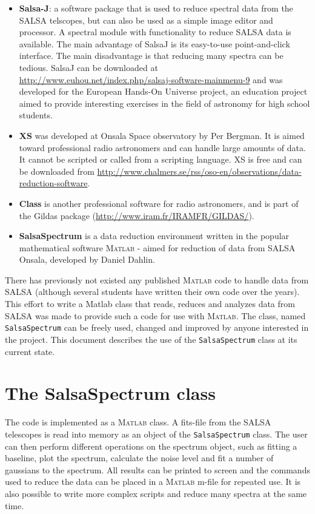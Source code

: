 \documentclass[11pt,a4paper]{article}
\begin{document}
\begin{itemize}
\item \textbf{Salsa-J}: a software package that is used to reduce
  spectral data from the SALSA telscopes, but can also be used as a
  simple image editor and processor. A spectral module with
  functionality to reduce SALSA data is available. The main advantage
  of SalsaJ is its easy-to-use point-and-click interface. The main
  disadvantage is that reducing many spectra can be tedious. SalsaJ
  can be downloaded at
  {\url{http://www.euhou.net/index.php/salsaj-software-mainmenu-9}}
  and was developed for the European Hands-On Universe project, an
  education project aimed to provide interesting exercises in the
  field of astronomy for high school students.
\item \textbf{XS} was developed at Onsala Space observatory by Per
  Bergman. It is aimed toward professional radio astronomers and can
  handle large amounts of data. It cannot be scripted or called from a
  scripting language. XS is free and can be downloaded from
  \url{http://www.chalmers.se/rss/oso-en/observations/data-reduction-software}.
\item \textbf{Class} is another professional software for radio
  astronomers, and is part of the Gildas package
  (\url{http://www.iram.fr/IRAMFR/GILDAS/}).
\item \textbf{SalsaSpectrum} is a data reduction environment written
  in the popular mathematical software \textsc{\textsc{Matlab}} -
  aimed for reduction of data from SALSA Onsala, developed by Daniel
  Dahlin.
\end{itemize}

There has previously not existed any published \textsc{Matlab} code to
handle data from SALSA (although several students have written their
own code over the years). This effort to write a Matlab class that
reads, reduces and analyzes data from SALSA was made to provide such a
code for use with \textsc{Matlab}. The class, named
\texttt{SalsaSpectrum} can be freely used, changed and improved by
anyone interested in the project. This document describes the use of
the \texttt{SalsaSpectrum} class at its current state.

\section{The SalsaSpectrum class}
\label{sec:salsaspectrum-class}

The code is implemented as a \textsc{Matlab} class. A fits-file from the SALSA
telescopes is read into memory as an object of the
\texttt{SalsaSpectrum} class. The user can then perform different
operations on the spectrum object, such as fitting a baseline, plot
the spectrum, calculate the noise level and fit a number of
gaussians to the spectrum. All results can be printed to screen and
the commands used to reduce the data can be placed in a \textsc{Matlab} m-file
for repeated use. It is also possible to write more complex scripts
and reduce many spectra at the same time.
\end{document}
